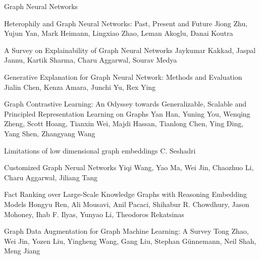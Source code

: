 \documentclass[11pt]{article}
\begin{document}
\begin{bulletin}
\begin{articlesection}{Graph Neural Networks}
\begin{article}
{Heterophily and Graph Neural Networks: Past, Present and Future}
{Jiong Zhu, Yujun Yan, Mark Heimann, Lingxiao Zhao, Leman Akoglu, Danai Koutra}

\end{article}
\begin{article}
{A Survey on Explainability of Graph Neural Networks}
{Jaykumar Kakkad, Jaspal Jannu, Kartik Sharma, Charu Aggarwal, Sourav Medya}

\end{article}
\begin{article}
{Generative Explanation for Graph Neural Network: Methods and Evaluation}
{Jialin Chen, Kenza Amara, Junchi Yu, Rex Ying}

\end{article}
\begin{article}
{Graph Contrastive Learning: An Odyssey towards Generalizable, Scalable and Principled Representation Learning on Graphs}
{Yan Han, Yuning You, Wenqing Zheng, Scott Hoang, Tianxin Wei, Majdi Hassan, Tianlong Chen, Ying Ding, Yang Shen, Zhangyang Wang}

\end{article}
\begin{article}
{Limitations of low dimensional graph embeddings}
{C. Seshadri}

\end{article}
\begin{article}
{Customized Graph Nerual Networks}
{Yiqi Wang, Yao Ma, Wei Jin, Chaozhuo Li, Charu Aggarwal, Jiliang Tang}

\end{article}
\begin{article}
{Fact Ranking over Large-Scale Knowledge Graphs with Reasoning Embedding Models}
{Hongyu Ren, Ali Mousavi, Anil Pacaci, Shihabur R. Chowdhury, Jason Mohoney,
Ihab F. Ilyas, Yunyao Li, Theodoros Rekatsinas}

\end{article}
\begin{article}
{Graph Data Augmentation for Graph Machine Learning: A Survey}
{Tong Zhao, Wei Jin, Yozen Liu, Yingheng Wang, Gang Liu, Stephan Günnemann, Neil Shah, Meng Jiang}

\end{article}
\end{articlesection}




\end{bulletin}
\end{document}

